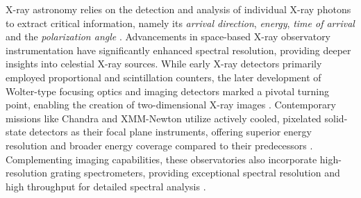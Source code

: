         	X-ray astronomy relies on the detection and analysis of individual X-ray photons to extract critical information, namely its \emph{arrival direction}, \emph{energy}, \emph{time of arrival} and the \emph{polarization angle} \cite{overviewXrays}. Advancements in space-based X-ray observatory instrumentation have significantly enhanced spectral resolution, providing deeper insights into celestial X-ray sources. While early X-ray detectors primarily employed proportional and scintillation counters, the later development of Wolter-type focusing optics and imaging detectors marked a pivotal turning point, enabling the creation of two-dimensional X-ray images \cite{giacconi1962evidence}. Contemporary missions like Chandra and XMM-Newton utilize actively cooled, pixelated solid-state detectors as their focal plane instruments, offering superior energy resolution and broader energy coverage compared to their predecessors \cite{jansen2001xmm,weisskopf2000chandra}. Complementing imaging capabilities, these observatories also incorporate high-resolution grating spectrometers, providing exceptional spectral resolution and high throughput for detailed spectral analysis \cite{paragb2017rev}.
        
